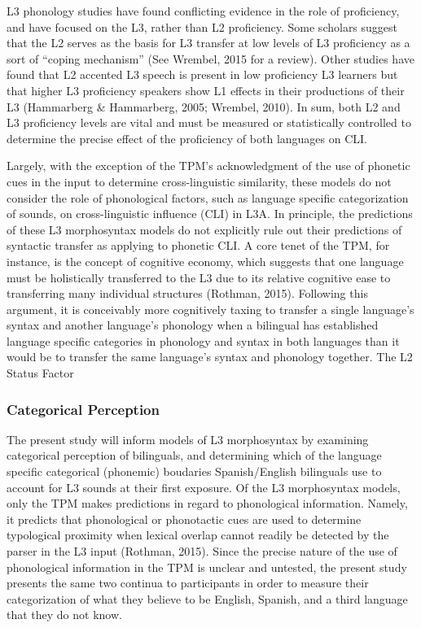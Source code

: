 \documentclass[
  english,
  man]{apa6}
\begin{document}
L3 phonology studies have found conflicting evidence in the role of proficiency, and have focused on the L3, rather than L2 proficiency.
Some scholars suggest that the L2 serves as the basis for L3 transfer at low levels of L3 proficiency as a sort of \enquote{coping mechanism} (See Wrembel, 2015 for a review).
Other studies have found that L2 accented L3 speech is present in low proficiency L3 learners but that higher L3 proficiency speakers show L1 effects in their productions of their L3 (Hammarberg \& Hammarberg, 2005; Wrembel, 2010).
In sum, both L2 and L3 proficiency levels are vital and must be measured or statistically controlled to determine the precise effect of the proficiency of both languages on CLI.

Largely, with the exception of the TPM's acknowledgment of the use of phonetic cues in the input to determine cross-linguistic similarity, these models do not consider the role of phonological factors, such as language specific categorization of sounds, on cross-linguistic influence (CLI) in L3A. In principle, the predictions of these L3 morphosyntax models do not explicitly rule out their predictions of syntactic transfer as applying to phonetic CLI. A core tenet of the TPM, for instance, is the concept of cognitive economy, which suggests that one language must be holistically transferred to the L3 due to its relative cognitive ease to transferring many individual structures (Rothman, 2015). Following this argument, it is conceivably more cognitively taxing to transfer a single language's syntax and another language's phonology when a bilingual has established language specific categories in phonology and syntax in both languages than it would be to transfer the same language's syntax and phonology together. The L2 Status Factor

\hypertarget{categorical-perception}{%
\subsubsection{Categorical Perception}\label{categorical-perception}}

The present study will inform models of L3 morphosyntax by examining categorical perception of bilinguals, and determining which of the language specific categorical (phonemic) boudaries Spanish/English bilinguals use to account for L3 sounds at their first exposure.
Of the L3 morphosyntax models, only the TPM makes predictions in regard to phonological information.
Namely, it predicts that phonological or phonotactic cues are used to determine typological proximity when lexical overlap cannot readily be detected by the parser in the L3 input (Rothman, 2015).
Since the precise nature of the use of phonological information in the TPM is unclear and untested, the present study presents the same two continua to participants in order to measure their categorization of what they believe to be English, Spanish, and a third language that they do not know.
\end{document}
